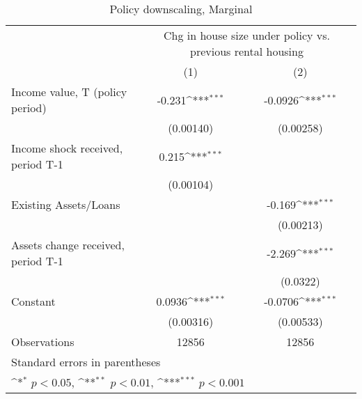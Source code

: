 \begin{table}[htbp]\centering
\def\sym#1{\ifmmode^{#1}\else\(^{#1}\)\fi}
\caption{Policy downscaling, Marginal}
\begin{tabular}{l*{2}{c}}
\hline\hline
                    &\multicolumn{2}{c}{Chg in house size under policy vs. previous rental housing}\\\cmidrule(lr){2-3}
                    &\multicolumn{1}{c}{(1)}         &\multicolumn{1}{c}{(2)}         \\
\hline
Income value, T (policy period)&      -0.231\sym{***}&     -0.0926\sym{***}\\
                    &   (0.00140)         &   (0.00258)         \\
Income shock received, period T-1&       0.215\sym{***}&                     \\
                    &   (0.00104)         &                     \\
Existing Assets/Loans&                     &      -0.169\sym{***}\\
                    &                     &   (0.00213)         \\
Assets change received, period T-1&                     &      -2.269\sym{***}\\
                    &                     &    (0.0322)         \\
Constant            &      0.0936\sym{***}&     -0.0706\sym{***}\\
                    &   (0.00316)         &   (0.00533)         \\
\hline
Observations        &       12856         &       12856         \\
\hline\hline
\multicolumn{3}{l}{\footnotesize Standard errors in parentheses}\\
\multicolumn{3}{l}{\footnotesize \sym{*} \(p<0.05\), \sym{**} \(p<0.01\), \sym{***} \(p<0.001\)}\\
\end{tabular}
\end{table}
